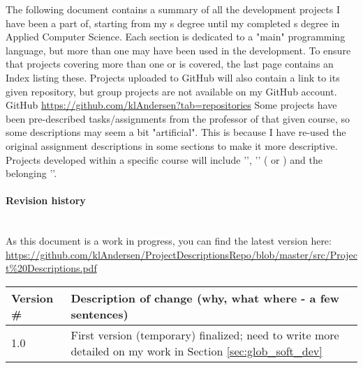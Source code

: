 \label{sec:introduction}
The following document contains a summary of all the development projects I have been a part of, starting from my s degree until my completed 
s degree in Applied Computer Science. 
Each section is dedicated to a "main" programming language, but more than one may have been used in the development. 
\vspace{0.5em}\newline	
To ensure that projects covering more than one  or  is covered, the last page contains an Index listing these.
Projects uploaded to GitHub will also contain a link to its given repository, but group projects are not available on my GitHub account.
\vspace{0.5em}\newline
GitHub  \url{https://github.com/klAndersen?tab=repositories}
\vspace{0.5em}\newline
Some projects have been pre-described tasks/assignments from the professor of that given course, so some descriptions may seem a bit "artificial". 
This is because I have re-used the original assignment descriptions in some sections to make it more descriptive. 
Projects developed within a specific course will include '', '' ( or ) and the belonging ''.
	
\paragraph{Revision history} ~\\
As this document is a work in progress, you can find the latest version here:
\url{https://github.com/klAndersen/ProjectDescriptionsRepo/blob/master/src/Project%20Descriptions.pdf}
\begin{center}
	\begin{tabular}[H]{|l|p{35em}|}
		\hline
		Version \#  & Description of change (why, what where - a few sentences) \\ 	\hline
		1.0   & First version (temporary) finalized; need to write more detailed on my work in Section \ref{sec:glob_soft_dev} \\	\hline
	\end{tabular}
\end{center}
